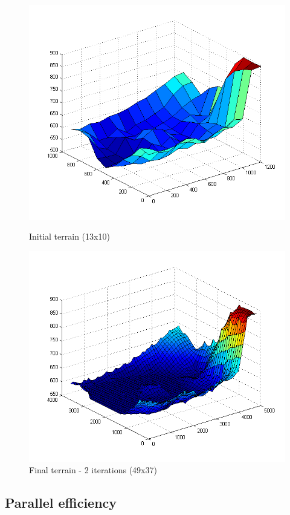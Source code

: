 \begin{figure}[!htb]
    \centering
    \includegraphics[width=\linewidth]{img/init.png}
    \caption{Initial terrain (13x10)}
\endminipage\hfill
{}
    \centering
    \includegraphics[width=\linewidth]{img/final.png}
    \caption{Final terrain - 2 iterations (49x37)}
\endminipage\hfill
\end{figure}

\subsection{Parallel efficiency}

